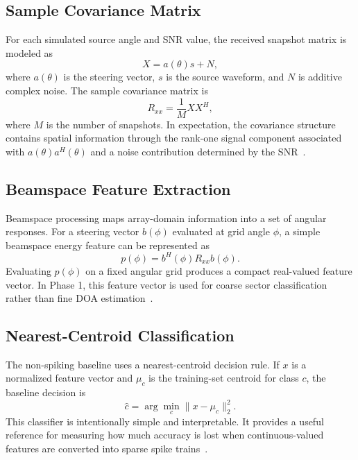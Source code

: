 \documentclass[11pt]{article}
\begin{document}
\subsection{Sample Covariance Matrix}

For each simulated source angle and SNR value, the received snapshot matrix is modeled as
\begin{equation}
    X = a(\theta)s + N,
\end{equation}
where $a(\theta)$ is the steering vector, $s$ is the source waveform, and $N$ is additive complex noise. The sample covariance matrix is
\begin{equation}
    R_{xx}=\frac{1}{M}XX^{H},
\end{equation}
where $M$ is the number of snapshots. In expectation, the covariance structure contains spatial information through the rank-one signal component associated with $a(\theta)a^{H}(\theta)$ and a noise contribution determined by the SNR~\cite{vantrees2002optimum,haykin2014adaptive}.

\subsection{Beamspace Feature Extraction}

Beamspace processing maps array-domain information into a set of angular responses. For a steering vector $b(\phi)$ evaluated at grid angle $\phi$, a simple beamspace energy feature can be represented as
\begin{equation}
    p(\phi)=b^{H}(\phi)R_{xx}b(\phi).
\end{equation}
Evaluating $p(\phi)$ on a fixed angular grid produces a compact real-valued feature vector. In Phase 1, this feature vector is used for coarse sector classification rather than fine DOA estimation~\cite{vantrees2002optimum}.

\subsection{Nearest-Centroid Classification}

The non-spiking baseline uses a nearest-centroid decision rule. If $x$ is a normalized feature vector and $\mu_c$ is the training-set centroid for class $c$, the baseline decision is
\begin{equation}
    \hat{c}=\arg\min_{c}\|x-\mu_c\|_2^2.
\end{equation}
This classifier is intentionally simple and interpretable. It provides a useful reference for measuring how much accuracy is lost when continuous-valued features are converted into sparse spike trains~\cite{duda2001pattern}.
\end{document}
